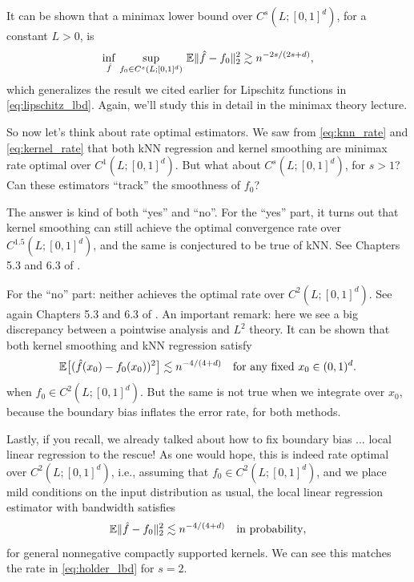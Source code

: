 \documentclass{article}
\begin{document}
It can be shown that a minimax lower bound over $C^s(L; [0,1]^d)$, for a
constant $L>0$, is    
\begin{equation}
\label{eq:holder_lbd}
\inf_{\hat{f}} \, \sup_{f_0 \in C^s(L; [0,1]^d)} \, \mathbb{E}\|\hat{f} - f_0\|_2^2   
\gtrsim n^{-2s/(2s+d)},
\end{equation}
which generalizes the result we cited earlier for Lipschitz functions in
\eqref{eq:lipschitz_lbd}. Again, we'll study this in detail in the minimax
theory lecture. 

So now let's think about rate optimal estimators. We saw from
\eqref{eq:knn_rate} and \eqref{eq:kernel_rate} that both kNN regression and
kernel smoothing are minimax rate optimal over $C^1(L; [0,1]^d)$. But what about
$C^s(L; [0,1]^d)$, for $s>1$? Can these estimators ``track'' the smoothness of
$f_0$? 

The answer is kind of both ``yes'' and ``no''. For the ``yes'' part, it turns
out that kernel smoothing can still achieve the optimal convergence rate over   
$C^{1.5}(L; [0,1]^d)$, and the same is conjectured to be true of kNN. See
Chapters 5.3 and 6.3 of \citet{gyorfi2002distribution}.

For the ``no'' part: neither achieves the optimal rate over $C^2(L;
[0,1]^d)$. See again Chapters 5.3 and 6.3 of \citet{gyorfi2002distribution}. An
important remark: here we see a big discrepancy between a pointwise analysis and
$L^2$ theory. It can be shown that both kernel smoothing and kNN regression
satisfy   
\[
\mathbb{E}\big[ (\hat{f}(x_0) - f_0(x_0))^2 \big] \lesssim n^{-4/(4+d)} \quad \text{for any
  fixed $x_0 \in (0,1)^d$}.   
\]
when $f_0 \in C^2(L; [0,1]^d)$. But the same is not true when we integrate over
$x_0$, because the boundary bias inflates the error rate, for both methods.  

Lastly, if you recall, we already talked about how to fix boundary bias ... 
local linear regression to the rescue! As one would hope, this is indeed rate
optimal over $C^2(L; [0,1]^d)$, i.e., assuming that $f_0 \in C^2(L; [0,1]^d)$,
and we place mild conditions on the input distribution as usual, the local
linear regression estimator with bandwidth  
satisfies      
\begin{equation}
\label{eq:kernel_rate}
\mathbb{E}\|\hat{f} - f_0\|_2^2 \lesssim n^{-4/(4+d)} \quad \text{in probability},
\end{equation}
for general nonnegative compactly supported kernels. We can see this matches the
rate in \eqref{eq:holder_lbd} for $s=2$.
\end{document}
